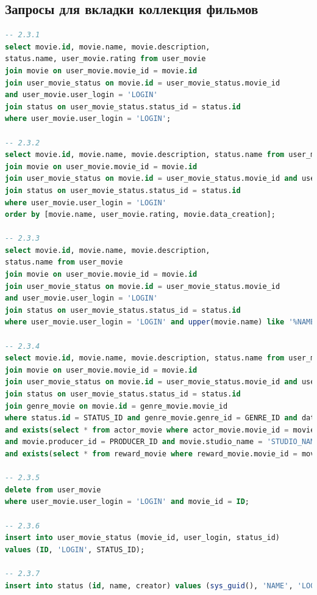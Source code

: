 \documentclass[a4paper,16pt]{article}
\begin{document}
\subsection{Запросы для вкладки коллекция фильмов}
\begin{lstlisting}[language=SQL]
-- 2.3.1
select movie.id, movie.name, movie.description,
status.name, user_movie.rating from user_movie
join movie on user_movie.movie_id = movie.id
join user_movie_status on movie.id = user_movie_status.movie_id
and user_movie.user_login = 'LOGIN'
join status on user_movie_status.status_id = status.id
where user_movie.user_login = 'LOGIN';

-- 2.3.2
select movie.id, movie.name, movie.description, status.name from user_movie
join movie on user_movie.movie_id = movie.id
join user_movie_status on movie.id = user_movie_status.movie_id and user_movie.user_login = 'LOGIN'
join status on user_movie_status.status_id = status.id
where user_movie.user_login = 'LOGIN'
order by [movie.name, user_movie.rating, movie.data_creation];

-- 2.3.3
select movie.id, movie.name, movie.description,
status.name from user_movie
join movie on user_movie.movie_id = movie.id
join user_movie_status on movie.id = user_movie_status.movie_id
and user_movie.user_login = 'LOGIN'
join status on user_movie_status.status_id = status.id
where user_movie.user_login = 'LOGIN' and upper(movie.name) like '%NAME%';

-- 2.3.4
select movie.id, movie.name, movie.description, status.name from user_movie
join movie on user_movie.movie_id = movie.id
join user_movie_status on movie.id = user_movie_status.movie_id and user_movie.user_login = 'LOGIN'
join status on user_movie_status.status_id = status.id
join genre_movie on movie.id = genre_movie.movie_id
where status.id = STATUS_ID and genre_movie.genre_id = GENRE_ID and data_creation = 'Data'
and exists(select * from actor_movie where actor_movie.movie_id = movie.id and actor_movie.actor_id = ACTOR_ID)
and movie.producer_id = PRODUCER_ID and movie.studio_name = 'STUDIO_NAME'
and exists(select * from reward_movie where reward_movie.movie_id = movie.id and reward_movie.reward_name = REWARD_NAME);

-- 2.3.5
delete from user_movie 
where user_movie.user_login = 'LOGIN' and movie_id = ID;

-- 2.3.6
insert into user_movie_status (movie_id, user_login, status_id) 
values (ID, 'LOGIN', STATUS_ID);

-- 2.3.7
insert into status (id, name, creator) values (sys_guid(), 'NAME', 'LOGIN');
\end{lstlisting}
\end{document}

